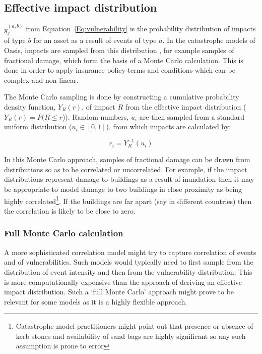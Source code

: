 \documentclass[a4paper,11pt]{extarticle} %
\begin{document}
\subsection{Effective impact distribution}
$y^{(a,b)}_j$ from Equation~\ref{Eq:vulnerability} is the probability distribution of impacts of type $b$ for an asset as a result of events of type $a$. In the catastrophe models of Oasis, impacts are sampled from this distribution \cite{OasisFinancialModule}, for example samples of fractional damage, which form the basis of a Monte Carlo calculation. This is done in order to apply insurance policy terms and conditions which can be complex and non-linear.

The Monte Carlo sampling is done by constructing a cumulative probability density function, $Y_R(r)$, of impact $R$ from the effective impact distribution ($Y_R(r) = P(R \le r$)). Random numbers, $u_i$ are then sampled from a standard uniform distribution ($u_i \in [0, 1]$), from which impacts are calculated by:

\begin{equation}
	\label{Eq:sampling}
	r_i = Y^{-1}_R(u_i)
\end{equation}   

In this Monte Carlo approach, samples of fractional damage can be drawn from distributions so as to be correlated or uncorrelated. For example, if the impact distributions represent damage to buildings as a result of inundation then it may be appropriate to model damage to two buildings in close proximity as being highly correlated\footnote{Catastrophe model practitioners might point out that presence or absence of kerb stones and availability of sand bags are highly significant so any such assumption is prone to error}. If the buildings are far apart (say in different countries) then the correlation is likely to be close to zero.

\subsubsection{Full Monte Carlo calculation}
A more sophisticated correlation model might try to capture correlation of events and of vulnerabilities. Such models would typically need to first sample from the distribution of event intensity and then from the vulnerability distribution. This is more computationally expensive than the approach of deriving an effective impact distribution. Such a `full Monte Carlo' approach might prove to be relevant for some models as it is a highly flexible approach. 
   
\end{document}
